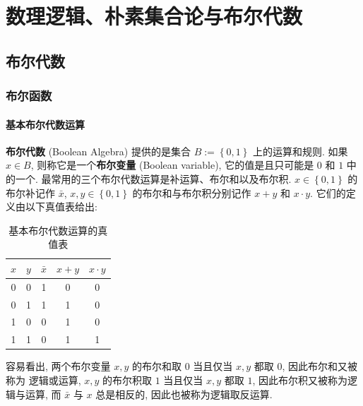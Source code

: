 \documentclass[10pt,UTF8]{book} %
\begin{document}

\newpage
\thispagestyle{empty}

\part{数理逻辑、朴素集合论与布尔代数}


\chapter{布尔代数}

\section{布尔函数}

\subsection{基本布尔代数运算}

\textbf{布尔代数} (Boolean Algebra) 提供的是集合 $B := \left\{ 0,1 \right\}$ 上的运算和规则.
如果 $x \in B$, 则称它是一个\textbf{布尔变量} (Boolean variable),
它的值是且只可能是 $0$ 和 $1$ 中的一个.
最常用的三个布尔代数运算是补运算、布尔和以及布尔积. $x \in \left\{0,1\right\}$
的布尔补记作 $\bar x$, $x, y \in \left\{ 0, 1 \right\}$ 的布尔和与布尔积分别记作
$x+y$ 和 $x \cdot y$. 它们的定义由以下真值表给出:
\begin{table}[H]
    \centering
    \caption{基本布尔代数运算的真值表}
    \begin{tabular}{cc|ccc}
        \toprule
        $x$ & $y$ & $\bar x$ & $x+y$ & $x \cdot y$ \\ 
        \midrule
        0 & 0 & 1 & 0 & 0 \\ 
        0 & 1 & 1 & 1 & 0 \\ 
        1 & 0 & 0 & 1 & 0 \\ 
        1 & 1 & 0 & 1 & 1 \\ 
        \bottomrule
    \end{tabular}
\end{table}
容易看出, 两个布尔变量 $x,y$ 的布尔和取 $0$ 当且仅当 $x,y$ 都取 $0$, 因此布尔和又被称为
逻辑或运算, $x, y$ 的布尔积取 $1$ 当且仅当 $x, y$ 都取 $1$, 因此布尔积又被称为逻辑与运算,
而 $\bar x$ 与 $x$ 总是相反的, 因此也被称为逻辑取反运算.
\end{document}
